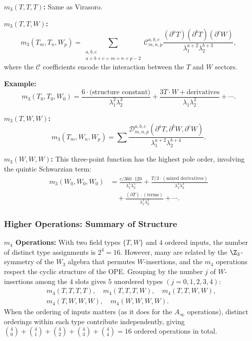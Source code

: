 \textbf{$m_3(T,T,T)$:} Same as Virasoro.

\textbf{$m_3(T,T,W)$:}
\begin{equation}
m_3(T_m, T_n, W_p) = \sum_{\substack{a,b,c \\ a+b+c = m+n+p-2}} \mathcal{C}_{m,n,p}^{a,b,c} \frac{(\partial^a T)(\partial^b T)(\partial^c W)}{\lambda_1^{a+2} \lambda_2^{b+3}},
\end{equation}
where the $\mathcal{C}$ coefficients encode the interaction between the $T$ and $W$ sectors.

\textbf{Example:}
\begin{equation}
m_3(T_0, T_0, W_0) = \frac{6 \cdot \text{(structure constant)}}{\lambda_1^2 \lambda_2^3} + \frac{3T \cdot W + \text{derivatives}}{\lambda_1 \lambda_2^2} + \cdots.
\end{equation}

\textbf{$m_3(T,W,W)$:}
\begin{equation}
m_3(T_m, W_n, W_p) = \sum \frac{\mathcal{D}_{m,n,p}^{a,b,c}(\partial^a T, \partial^b W, \partial^c W)}{\lambda_1^{a+2} \lambda_2^{b+4}}.
\end{equation}

\textbf{$m_3(W,W,W)$:} This three-point function has the highest pole order, involving the quintic Schwarzian term:
\begin{align}
m_3(W_0, W_0, W_0) &= \frac{c/360 \cdot 120}{\lambda_1^5 \lambda_2^5} + \frac{T/3 \cdot (\text{mixed derivatives})}{\lambda_1^3 \lambda_2^3}\\
&\quad + \frac{(\partial T) \cdot (\text{terms})}{\lambda_1^2 \lambda_2^2} + \cdots.
\end{align}

\subsubsection{Higher Operations: Summary of Structure}

\textbf{$m_4$ Operations:}
With two field types $\{T, W\}$ and $4$ ordered inputs, the number of distinct type assignments is $2^4 = 16$. However, many are related by the $\Z_3$-symmetry of the $W_3$ algebra that permutes $W$-insertions, and the $m_4$ operations respect the cyclic structure of the OPE. Grouping by the number $j$ of $W$-insertions among the $4$ slots gives $5$ unordered types $(j = 0,1,2,3,4)$:
\begin{align}
&m_4(T,T,T,T), \quad m_4(T,T,T,W), \quad m_4(T,T,W,W),\\
&m_4(T,W,W,W), \quad m_4(W,W,W,W).
\end{align}
When the ordering of inputs matters (as it does for the $A_\infty$ operations), distinct orderings within each type contribute independently, giving $\binom{4}{0} + \binom{4}{1} + \binom{4}{2} + \binom{4}{3} + \binom{4}{4} = 16$ ordered operations in total.

